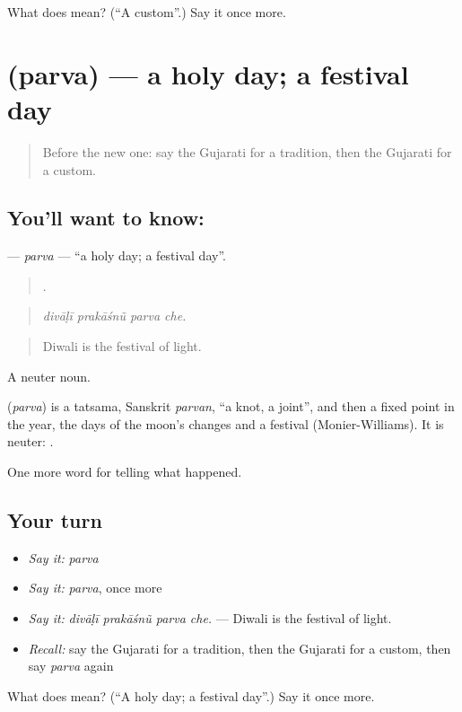 \begin{tcolorbox}[breakable,colback=teal!4,colframe=teal!35!black,title={Before you move on}]
What does  mean? (\textquotedblleft{}A custom\textquotedblright{}.) Say it once more.
\end{tcolorbox}
\section[\texorpdfstring{\gu{પર્વ} (parva)}{પર્વ (parva)}]{ (parva) — a holy day; a festival day}

\label{lesson:GU-C327-parva}



\begin{quote}
Before the new one: say the Gujarati for a tradition, then the Gujarati for a custom.
\end{quote}

\subsection*{You'll want to know: }
\textbf{} — \emph{parva} — \textquotedblleft{}a holy day; a festival day\textquotedblright{}.

\begin{quote}
   .
\end{quote}

\begin{quote}
\emph{divāḷī prakāśnũ parva che.}
\end{quote}

\begin{quote}
Diwali is the festival of light.
\end{quote}

A neuter noun.

\begin{cousinweb}
\textbf{} (\emph{parva}) is a tatsama, Sanskrit \emph{parvan}, \textquotedblleft{}a knot, a joint\textquotedblright{}, and then a fixed point in the year, the days of the moon's changes and a festival (Monier-Williams). It is neuter: \textbf{ }.
\end{cousinweb}

\begin{grammarlens}[title={What you've built}]
One more word for telling what happened.
\end{grammarlens}

\subsection*{Your turn}
\begin{itemize}
\raggedright
  \item \emph{Say it:} \emph{parva}
  \item \emph{Say it:} \emph{parva}, once more
  \item \emph{Say it:} \emph{divāḷī prakāśnũ parva che.} — Diwali is the festival of light.
  \item \emph{Recall:} say the Gujarati for a tradition, then the Gujarati for a custom, then say \emph{parva} again
\end{itemize}

\begin{tcolorbox}[breakable,colback=teal!4,colframe=teal!35!black,title={Before you move on}]
What does  mean? (\textquotedblleft{}A holy day; a festival day\textquotedblright{}.) Say it once more.
\end{tcolorbox}
